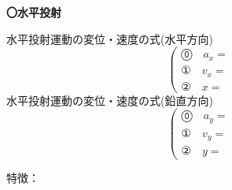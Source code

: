 \documentclass[11pt,twoside,fleqn]{article}
\begin{document}
\begin{itembox}[l]{\textbf{〇水平投射}}
	\begin{minipage}[t]{0.60\linewidth}
		水平投射運動の変位・速度の式(水平方向)
		\Large
		\[
		\left(
		\begin{array}{ll}
			\text{⓪} \quad a_x = & \\
			\text{①} \quad v_x = & \\
			\text{②} \quad x = & 
		\end{array}
		\right.
		\]
		\normalsize
		水平投射運動の変位・速度の式(鉛直方向)
		\Large
		\[
		\left(
		\begin{array}{ll}
			\text{⓪} \quad a_y = & \\
			\text{①} \quad v_y = & \\
			\text{②} \quad y = &
		\end{array}
		\right.
		\]
		\normalsize
	\end{minipage}
	\hfill
	\begin{minipage}[t]{0.40\linewidth}
		\begin{center}
		\end{center}
	\end{minipage}
	\begin{shadebox}
		特徴：\\\\\\\\\\\\\\\\
	\end{shadebox}
\end{itembox}
\end{document}
